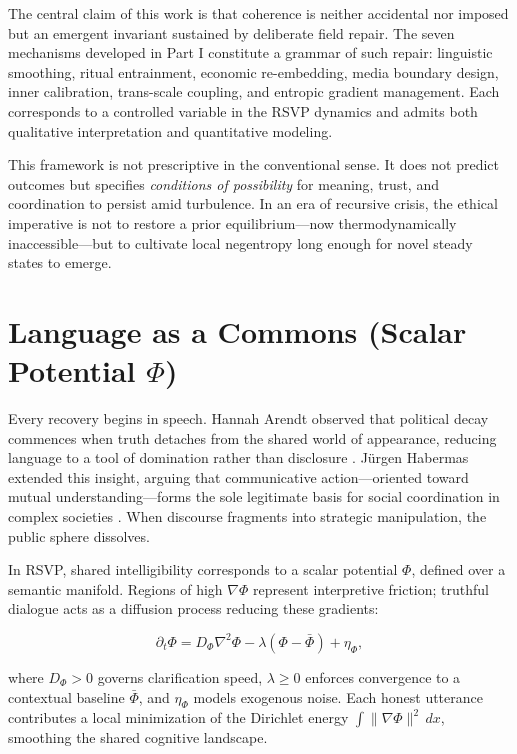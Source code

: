 \documentclass[12pt,a4paper]{article}
\begin{document}
The central claim of this work is that coherence is neither accidental nor imposed but an emergent invariant sustained by deliberate field repair. The seven mechanisms developed in Part I constitute a grammar of such repair: linguistic smoothing, ritual entrainment, economic re-embedding, media boundary design, inner calibration, trans-scale coupling, and entropic gradient management. Each corresponds to a controlled variable in the RSVP dynamics and admits both qualitative interpretation and quantitative modeling.

This framework is not prescriptive in the conventional sense. It does not predict outcomes but specifies \emph{conditions of possibility} for meaning, trust, and coordination to persist amid turbulence. In an era of recursive crisis, the ethical imperative is not to restore a prior equilibrium—now thermodynamically inaccessible—but to cultivate local negentropy long enough for novel steady states to emerge.

\section{Language as a Commons \quad (Scalar Potential $\Phi$)}

Every recovery begins in speech. Hannah Arendt observed that political decay commences when truth detaches from the shared world of appearance, reducing language to a tool of domination rather than disclosure \cite{arendt1967truth}. Jürgen Habermas extended this insight, arguing that communicative action—oriented toward mutual understanding—forms the sole legitimate basis for social coordination in complex societies \cite{habermas1984communicative}. When discourse fragments into strategic manipulation, the public sphere dissolves.

In RSVP, shared intelligibility corresponds to a scalar potential $\Phi$, defined over a semantic manifold. Regions of high $\nabla\Phi$ represent interpretive friction; truthful dialogue acts as a diffusion process reducing these gradients:

\begin{equation}
\partial_t \Phi = D_\Phi \nabla^2 \Phi - \lambda (\Phi - \bar{\Phi}) + \eta_\Phi,
\end{equation}

where $D_\Phi > 0$ governs clarification speed, $\lambda \ge 0$ enforces convergence to a contextual baseline $\bar{\Phi}$, and $\eta_\Phi$ models exogenous noise. Each honest utterance contributes a local minimization of the Dirichlet energy $\int \|\nabla \Phi\|^2\,dx$, smoothing the shared cognitive landscape.
\end{document}
